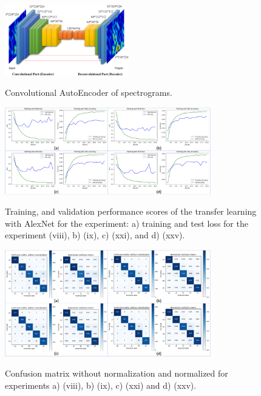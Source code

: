 \documentclass[journal]{IEEEtran}
\begin{document}
\begin{figure}[h]
\centering
\footnotesize
{\includegraphics[width=0.48\textwidth,keepaspectratio]{img/cae.png}}
\caption{Convolutional AutoEncoder of spectrograms.}
\label{fig:cae_interpolation}
\end{figure}





\begin{figure}
\centering
{\includegraphics[width=0.8\textwidth,keepaspectratio]{img/curvas_entrenamiento.png}}
\caption{Training, and validation performance scores of the transfer learning with AlexNet for the experiment: a) training and test loss for the experiment (viii), b) (ix), c) (xxi), and d) (xxv).}
\label{fig:da_training}
\end{figure}
\begin{figure}
\centering
{\includegraphics[width=0.8\textwidth,keepaspectratio]{img/matriz_confusion.png}}
\caption{Confusion matrix without normalization and normalized for experiments a) (viii), b) (ix), c) (xxi) and d) (xxv).}
\label{fig:da_confusion_matrix}
\end{figure}
\end{document}

